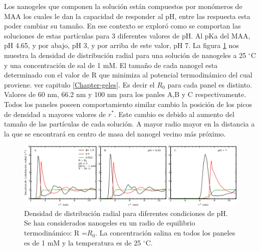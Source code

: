 Los nanogeles que componen la soluci\'on est\'an compuestos por mon\'omeros de MAA los cuales le dan la capacidad de responder al pH, entre las respuesta esta poder cambiar su tama\~no.
En ese contexto se explor\'o como se comportan las soluciones de estas part\'iculas para 3 diferentes valores de pH. Al pKa del MAA, pH 4.65, y por abajo, pH 3, y por arriba de este valor, pH 7.
La figura \ref{fig:mc:rdf-phs-0} nos muestra la densidad de distribuci\'on radial para una soluci\'on de nanogeles a 25 $^\circ$C y una concentraci\'on de sal de 1 mM. El tama\~no de cada nanogel esta determinado con el valor de R que minimiza al potencial termodin\'amico del cual proviene. ver capitulo \ref{Chapter-geles}.  Es decir el $R_0$ para cada panel es distinto. Valores de 60 nm, 66.2 nm y 100 nm para los panles A,B y C respectivamente. 
Todos los paneles poseen comportamiento similar cambio la posici\'on de los picos de densidad a mayores valores de $r^\ast$. Este cambio es debido al aumento del tama\~no de las part\'iculas de cada soluci\'on. A mayor radio mayor en la distancia a la que se encontrar\'a en centro de masa del nanogel vecino m\'as pr\'oximo. 


\begin{figure}[!htb]
	\centering
	\includegraphics[width=1\linewidth]{Figures/graph-mc/rdf0-pHs.pdf}
	\caption{Densidad de distribuci\'on radial para diferentes condiciones de pH. Se han considerados nanogeles en un radio de equilibrio termodin\'amico: R =$R_0$.  La concentraci\'on salina en todos los paneles es de 1 mM y la temperatura es de 25 $^\circ$C.}
	\label{fig:mc:rdf-phs-0}
\end{figure}
